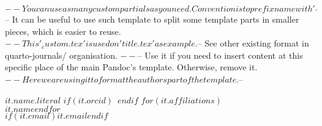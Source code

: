 $-- You can use as many custom partials as you need. Convention is to prefix name with '_'
$-- It can be useful to use such template to split some template parts in smaller pieces, which is easier to reuse. 
$-- This '_custom.tex' is used on 'title.tex' as example.
$-- See other existing format in quarto-journals/ organisation.
$-- %
$-- Use it if you need to insert content at this specific place of the main Pandoc's template. Otherwise, remove it.
$-- Here we are using it to format the authors part of the template.
$-- %

\textbf{\normalsize $it.name.literal$} %
$if(it.orcid)$~$endif$ %
$for(it.affiliations)$\\{\normalsize $it.name$}$endfor$ %
\\$if(it.email)$\href{mailto:$it.email$}{\normalsize\textit{$it.email$}}$endif$ %

